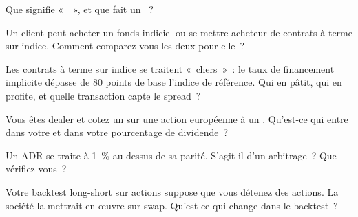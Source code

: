 \begin{interviewq}\label{iq:m1:delta-one-instruments:1}
Que signifie «~~», et que fait un ~?
\end{interviewq}

\begin{interviewq}\label{iq:m1:delta-one-instruments:2}
Un client peut acheter un fonds indiciel ou se mettre acheteur de contrats à terme sur indice. Comment
comparez-vous les deux pour elle~?
\end{interviewq}

\begin{interviewq}\label{iq:m1:delta-one-instruments:3}
Les contrats à terme sur indice se traitent «~chers~»~: le taux de financement implicite
dépasse de 80 points de base l'indice de référence. Qui en pâtit, qui en profite, et quelle
transaction capte le spread~?
\end{interviewq}

\begin{interviewq}\label{iq:m1:delta-one-instruments:4}
Vous êtes dealer et cotez un  sur une action européenne à un
. Qu'est-ce qui entre dans votre  et dans votre pourcentage de dividende~?
\end{interviewq}

\begin{interviewq}\label{iq:m1:delta-one-instruments:5}
Un ADR se traite à 1~\% au-dessus de sa parité. S'agit-il d'un arbitrage~? Que vérifiez-vous~?
\end{interviewq}

\begin{interviewq}\label{iq:m1:delta-one-instruments:6}
Votre backtest long-short sur actions suppose que vous détenez des actions. La société
la mettrait en œuvre sur swap. Qu'est-ce qui change dans le backtest~?
\end{interviewq}
